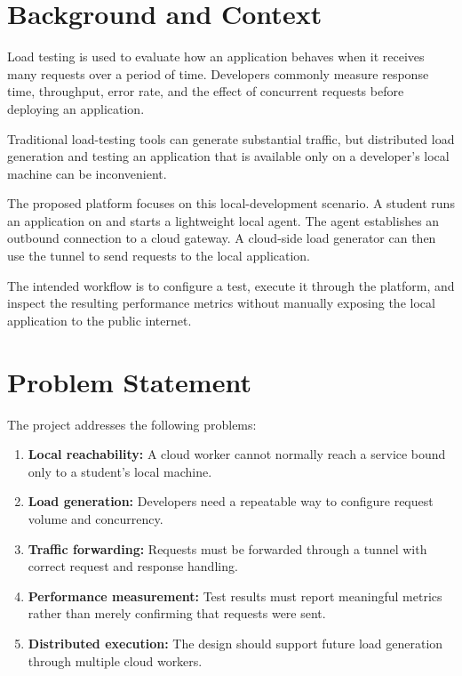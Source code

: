 \documentclass[11pt,a4paper,oneside]{report}
\newcommand{\code}[1]{\texttt{\detokenize{#1}}}
\begin{document}
\section{Background and Context}

Load testing is used to evaluate how an application behaves when
it receives many requests over a period of time. Developers
commonly measure response time, throughput, error rate, and the
effect of concurrent requests before deploying an application.

Traditional load-testing tools can generate substantial traffic,
but distributed load generation and testing an application that
is available only on a developer's local machine can be
inconvenient.

The proposed platform focuses on this local-development scenario.
A student runs an application on \code{localhost} and starts a
lightweight local agent. The agent establishes an outbound
connection to a cloud gateway. A cloud-side load generator can
then use the tunnel to send requests to the local application.

The intended workflow is to configure a test, execute it through
the platform, and inspect the resulting performance metrics
without manually exposing the local application to the public
internet.

\section{Problem Statement}

The project addresses the following problems:

\begin{enumerate}
  \item \textbf{Local reachability:}
  A cloud worker cannot normally reach a service bound only to
  a student's local machine.

  \item \textbf{Load generation:}
  Developers need a repeatable way to configure request volume
  and concurrency.

  \item \textbf{Traffic forwarding:}
  Requests must be forwarded through a tunnel with correct
  request and response handling.

  \item \textbf{Performance measurement:}
  Test results must report meaningful metrics rather than
  merely confirming that requests were sent.

  \item \textbf{Distributed execution:}
  The design should support future load generation through
  multiple cloud workers.
\end{enumerate}
\end{document}
